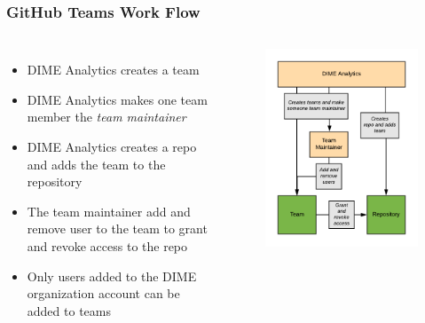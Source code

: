 \documentclass[aspectratio=169]{beamer} %
\begin{document}
\begin{frame}
	\frametitle{GitHub Teams Work Flow}

	\begin{columns}[c]
		
		\begin{itemize}
			\item DIME Analytics creates a team
			\item DIME Analytics makes one team member the \textit{team maintainer}
			\item DIME Analytics creates a repo and adds the team to the repository
			\item The team maintainer add and remove user to the team to grant and revoke access to the repo
			\item Only users added to the DIME organization account can be added to teams
		\end{itemize}
		
		\begin{figure}
			\centering
			\includegraphics[width=1\linewidth]{./img/teams-workflow}
		\end{figure}
		
	\end{columns}
\end{frame}
\end{document}
